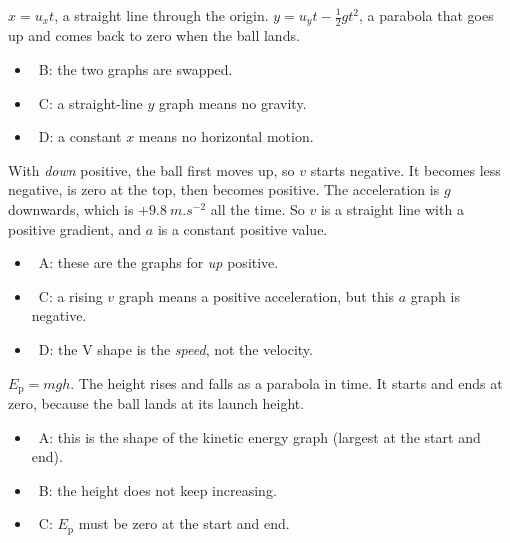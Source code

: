 \documentclass[12pt]{article}
\begin{document}
\begin{practiceanswers}
\begin{practiceans}
  $x = u_x t$, a straight line through the origin. $y = u_y t - \frac{1}{2}gt^2$, a parabola that
  goes up and comes back to zero when the ball lands.
  \begin{itemize}
    \item \xmark\ B: the two graphs are swapped.
    \item \xmark\ C: a straight-line $y$ graph means no gravity.
    \item \xmark\ D: a constant $x$ means no horizontal motion.
  \end{itemize}
\end{practiceans}

\begin{practiceans}
  With \emph{down} positive, the ball first moves up, so $v$ starts negative. It becomes less
  negative, is zero at the top, then becomes positive. The acceleration is $g$ downwards, which is
  $+\qty{9.8}{m.s^{-2}}$ all the time. So $v$ is a straight line with a positive gradient, and $a$ is
  a constant positive value.
  \begin{itemize}
    \item \xmark\ A: these are the graphs for \emph{up} positive.
    \item \xmark\ C: a rising $v$ graph means a positive acceleration, but this $a$ graph is negative.
    \item \xmark\ D: the V shape is the \emph{speed}, not the velocity.
  \end{itemize}
\end{practiceans}

\begin{practiceans}
  $E_\mathrm{p} = mgh$. The height rises and falls as a parabola in time. It starts and ends at
  zero, because the ball lands at its launch height.
  \begin{itemize}
    \item \xmark\ A: this is the shape of the kinetic energy graph (largest at the start and end).
    \item \xmark\ B: the height does not keep increasing.
    \item \xmark\ C: $E_\mathrm{p}$ must be zero at the start and end.
  \end{itemize}
\end{practiceans}


\end{practiceanswers}
\end{document}

